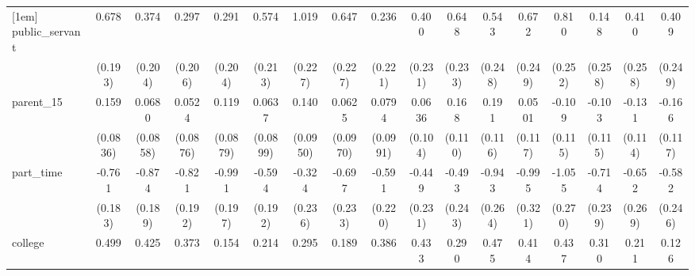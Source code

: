 {\begin{tabular}{l*{16}{c}}
[1em]
public\_servant      &       0.678\sym{***}&       0.374         &       0.297         &       0.291         &       0.574\sym{**} &       1.019\sym{***}&       0.647\sym{**} &       0.236         &       0.400         &       0.648\sym{**} &       0.543\sym{*}  &       0.672\sym{**} &       0.810\sym{**} &       0.148         &       0.410         &       0.409         \\
                    &     (0.193)         &     (0.204)         &     (0.206)         &     (0.204)         &     (0.213)         &     (0.227)         &     (0.227)         &     (0.221)         &     (0.231)         &     (0.233)         &     (0.248)         &     (0.249)         &     (0.252)         &     (0.258)         &     (0.258)         &     (0.249)         \\
[1em]
parent\_15           &       0.159         &      0.0680         &      0.0524         &       0.119         &      0.0637         &       0.140         &      0.0625         &      0.0794         &      0.0636         &       0.168         &       0.191         &      0.0501         &      -0.109         &      -0.103         &      -0.131         &      -0.166         \\
                    &    (0.0836)         &    (0.0858)         &    (0.0876)         &    (0.0879)         &    (0.0899)         &    (0.0950)         &    (0.0970)         &    (0.0991)         &     (0.104)         &     (0.110)         &     (0.116)         &     (0.117)         &     (0.115)         &     (0.115)         &     (0.114)         &     (0.117)         \\
[1em]
part\_time           &      -0.761\sym{***}&      -0.874\sym{***}&      -0.821\sym{***}&      -0.991\sym{***}&      -0.594\sym{**} &      -0.324         &      -0.697\sym{**} &      -0.591\sym{**} &      -0.449         &      -0.493\sym{*}  &      -0.943\sym{***}&      -0.995\sym{**} &      -1.055\sym{***}&      -0.714\sym{**} &      -0.652\sym{*}  &      -0.582\sym{*}  \\
                    &     (0.183)         &     (0.189)         &     (0.192)         &     (0.197)         &     (0.192)         &     (0.236)         &     (0.233)         &     (0.220)         &     (0.231)         &     (0.243)         &     (0.264)         &     (0.321)         &     (0.270)         &     (0.239)         &     (0.269)         &     (0.246)         \\
[1em]
college             &       0.499\sym{***}&       0.425\sym{***}&       0.373\sym{***}&       0.154         &       0.214         &       0.295\sym{*}  &       0.189         &       0.386\sym{**} &       0.433\sym{**} &       0.290\sym{*}  &       0.475\sym{**} &       0.414\sym{**} &       0.437\sym{**} &       0.310\sym{*}  &       0.211         &       0.126         \\

\end{tabular}}
